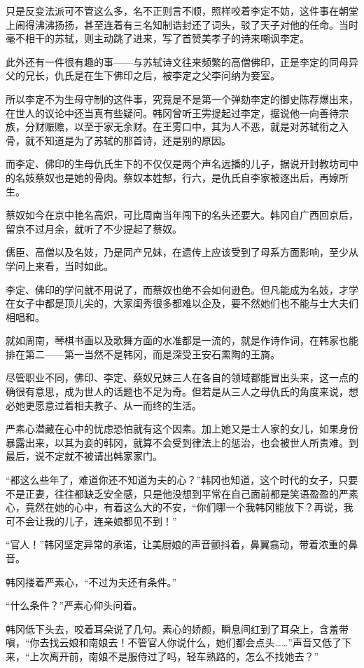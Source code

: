 只是反变法派可不管这么多，名不正则言不顺，照样咬着李定不妨，这件事在朝堂上闹得沸沸扬扬，甚至连着有三名知制诰封还了词头，驳了天子对他的任命。当时毫不相干的苏轼，则主动跳了进来，写了首赞美孝子的诗来嘲讽李定。

此外还有一件很有趣的事——与苏轼诗文往来频繁的高僧佛印，正是李定的同母异父的兄长，仇氏是在生下佛印之后，被李定之父李问纳为妾室。

所以李定不为生母守制的这件事，究竟是不是第一个弹劾李定的御史陈荐爆出来，在世人的议论中还当真有些疑问。韩冈曾听王雱提起过李定，据说他一向善待宗族，分财赈赡，以至于家无余财。在王雱口中，其为人不恶，就是对苏轼衔之入骨，就不知道是为了苏轼的那首诗，还是别的原因。

而李定、佛印的生母仇氏生下的不仅仅是两个声名远播的儿子，据说开封教坊司中的名妓蔡奴也是她的骨肉。蔡奴本姓郜，行六，是仇氏自李家被逐出后，再嫁所生。

蔡奴如今在京中艳名高炽，可比周南当年闯下的名头还要大。韩冈自广西回京后，留京不过月余，就听了不少提起了蔡奴。

儒臣、高僧以及名妓，乃是同产兄妹，在遗传上应该受到了母系方面影响，至少从学问上来看，当时如此。

李定、佛印的学问就不用说了，而蔡奴也绝不会如何逊色。但凡能成为名妓，才学在女子中都是顶儿尖的，大家闺秀很多都难以企及，要不然她们也不能与士大夫们相唱和。

就如周南，琴棋书画以及歌舞方面的水准都是一流的，就是作诗作词，在韩家也能排在第二——第一当然不是韩冈，而是深受王安石熏陶的王旖。

尽管职业不同，佛印、李定、蔡奴兄妹三人在各自的领域都能冒出头来，这一点的确很有意思，成为世人的话题也不足为奇。但若是从三人之母仇氏的角度来说，想必她更愿意过着相夫教子、从一而终的生活。

严素心潜藏在心中的忧虑恐怕就有这个因素。加上她又是士人家的女儿，如果身份暴露出来，以其为妾的韩冈，就算不会受到律法上的惩治，也会被世人所责难。到最后，说不定就不被请出韩家家门。

“都这么些年了，难道你还不知道为夫的心？”韩冈也知道，这个时代的女子，只要不是正妻，往往都缺乏安全感，只是他没想到平常在自己面前都是笑语盈盈的严素心，竟然在她的心中，有着这么大的不安，“你们哪一个我韩冈能放下？再说，我可不会让我的儿子，连亲娘都见不到！”

“官人！”韩冈坚定异常的承诺，让美厨娘的声音颤抖着，鼻翼翕动，带着浓重的鼻音。

韩冈搂着严素心，“不过为夫还有条件。”

“什么条件？”严素心仰头问着。

韩冈低下头去，咬着耳朵说了几句。素心的娇颜，瞬息间红到了耳朵上，含羞带嗔，“你去找云娘和南娘去！不管官人你说什么，她们都会点头……”声音又低了下来，“上次离开前，南娘不是服侍过了吗，轻车熟路的，怎么不找她去？”

